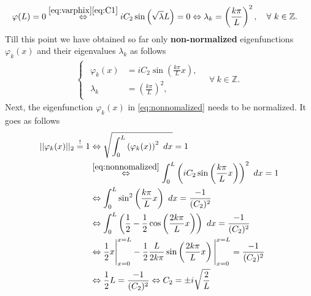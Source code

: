 \documentclass[12pt]{article}
\begin{document}
\begin{enumerate}
\begin{align}
		       & \varphi(L)=0 \stackrel{\eqref{eq:varphix}\eqref{eq:C1}}{\Leftrightarrow}
		      iC_{2}\sin\left( \sqrt{\lambda}L \right) = 0
		      \Leftrightarrow \lambda_{k} = \left( \frac{k\pi}{L} \right)^2,\quad\forall \ k\in\mathbb{Z}.
	      \end{align}
	      Till this point we have obtained so far only \textbf{non-normalized}
	      eigenfunctions $\varphi_k(x)$ and their eigenvalues $\lambda_k$ as follows
	      \begin{align}
		      \label{eq:nonnomalized}
		      \begin{cases}
			      \begin{aligned}
				      \varphi_k(x) & = iC_{2} \sin\left(\frac{k \pi}{L} x\right), \\
				      \lambda_k    & = \left( \frac{k \pi}{L} \right)^2,
			      \end{aligned}
			      \quad\forall\ k\in\mathbb{Z}.
		      \end{cases}
	      \end{align}
	      Next, the eigenfunction $\varphi_k(x)$  in \eqref{eq:nonnomalized} needs to be normalized. It goes as follows
	      \begin{align}
		      ||\varphi_{k}(x)||_{2} \stackrel{!}{=} 1 
		       & \Leftrightarrow \sqrt{\int_{0}^{L} \left( \varphi_{k}(x) \right)^2\ dx } = 1 \notag   \\
		       & \stackrel{\eqref{eq:nonnomalized}}{\Leftrightarrow }
		      \int_{0}^{L} \left( iC_{2} \sin\left(\frac{k \pi}{L} x\right) \right)^2 \ dx  = 1 \notag \\
		       & \Leftrightarrow 
		      \int_{0}^{L} \sin^2\left(\frac{k \pi}{L} x\right) \ dx  = \frac{-1}{(C_{2})^2} \notag    \\
		       & \Leftrightarrow 
		      \int_{0}^{L} \left(\frac{1}{2} - \frac{1}{2}\cos\left( \frac{2k \pi}{L} x \right) \right) \ dx 
		      = \frac{-1}{(C_{2})^2} \notag                                                            \\
		       & \Leftrightarrow 
		      \frac{1}{2}x\Bigg|_{x=0}^{x=L} 
		      -\frac{1}{2}\frac{L}{2k\pi}\sin\left(\frac{2k\pi}{L}x\right)\Bigg|_{x=0}^{x=L}
		      = \frac{-1}{(C_{2})^2} \notag                                                            \\
		       & \Leftrightarrow
		      \frac{1}{2}L = \frac{-1}{(C_{2})^2}
		      \Leftrightarrow
		      C_{2} = \pm i\sqrt{\frac{2}{L}}
	      \end{align}
	      \begin{itemize}

\end{itemize}
\end{enumerate}
\end{document}
